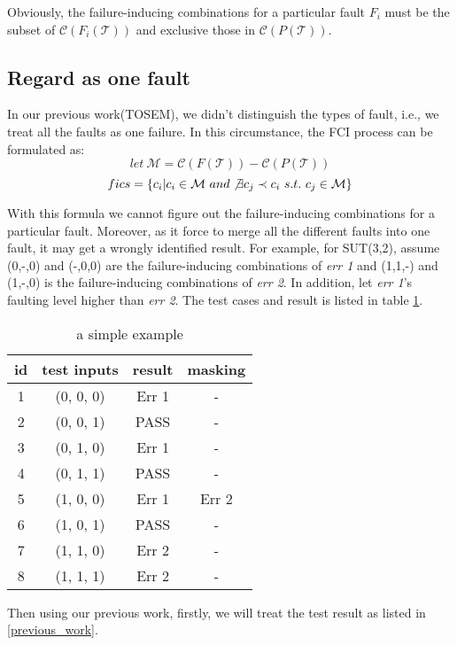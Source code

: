 \documentclass{sig-alternate}
\begin{document}
Obviously, the failure-inducing combinations for a particular fault $F_{i}$ must be the subset of $\mathcal{C}(F_{i}(\mathcal{T}))$ and exclusive those in $\mathcal{C}(P(\mathcal{T}))$.

\subsection{Regard as one fault}

In our previous work(TOSEM), we didn't distinguish the types of fault, i.e., we treat all the faults as one failure. In this circumstance, the FCI process can be formulated as:
 $$let\ \mathcal{M} = \mathcal{C}(F(\mathcal{T})) - \mathcal{C}(P(\mathcal{T}))$$
$$fics = \{c_{i} | c_{i} \in \mathcal{M} \ and \not\exists c_{j} \prec c_{i}\ s.t.\ c_{j} \in \mathcal{M} \}$$

With this formula we cannot figure out the failure-inducing combinations for a particular fault. Moreover, as it force to merge all the different faults into one fault, it may get a wrongly identified result. For example, for SUT(3,2), assume (0,-,0) and (-,0,0) are the failure-inducing combinations of \emph{err 1} and (1,1,-) and (1,-,0) is the failure-inducing combinations of \emph{err 2}. In addition, let \emph{err 1}'s faulting level higher than \emph{err 2}. The test cases and result is listed in table \ref{example_first_scenario}.

\begin{table}
\centering
\caption{a simple example}
\label{example_first_scenario}
\begin{tabular}{|c|c|c|c|} \hline
id&test inputs & result & masking \\\hline
1&(0, 0, 0) &  Err 1 & -\\ \hline
2&(0, 0, 1) &  PASS & -\\ \hline
3&(0, 1, 0) &  Err 1 & -\\ \hline
4&(0, 1, 1) &  PASS & -\\ \hline
5&(1, 0, 0) &  Err 1 & Err 2\\ \hline
6&(1, 0, 1) &  PASS & -\\ \hline
7&(1, 1, 0) &  Err 2 & -\\ \hline
8&(1, 1, 1) &  Err 2 & -\\ \hline
\hline\end{tabular}
\end{table}

Then using our previous work, firstly, we will treat the test result as listed in \ref{previous_work}.
\end{document}
